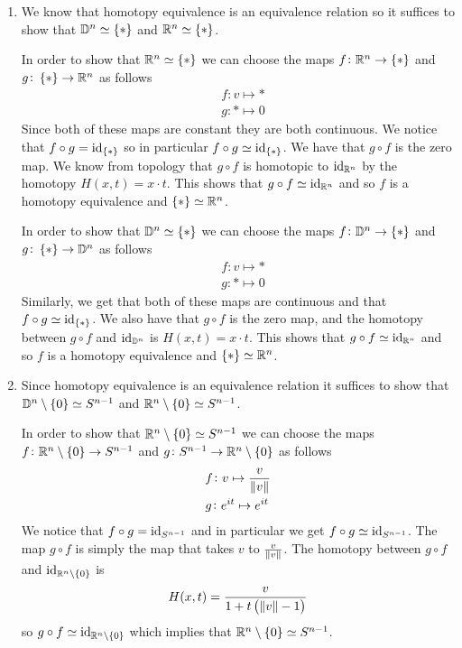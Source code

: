 \documentclass[11pt,a4paper]{article}
\begin{document}
\begin{solution} \phantom{}
  \begin{enumerate}
    \item[(1)] We know that homotopy equivalence is an equivalence relation
      so it suffices to show that $\mathbb{D}^n \simeq \left\{*\right\}$ and
      $\mathbb{R}^n \simeq \left\{*\right\}$.

      In order to show that $\mathbb{R}^n \simeq \left\{*\right\}$ we can choose the maps
      $f \colon \mathbb{R}^n \to \left\{*\right\}$ and $g \colon \left\{*\right\} \to \mathbb{R}^n$
      as follows
      \begin{align*}
        &f \colon v \mapsto * \\ 
        &g \colon * \mapsto 0 
      \end{align*}
      Since both of these maps are constant they are both continuous.
      We notice that $f \circ g = \operatorname{id}_{\left\{*\right\}}$ so in particular
      $f \circ g \simeq \operatorname{id}_{\left\{*\right\}}$.
      We have that $g \circ f$ is the zero map.
      We know from topology that $g \circ f$ is homotopic to $\operatorname{id}_{\mathbb{R}^n}$
      by the homotopy $H(x,t) = x \cdot t$.
      This shows that $g \circ f \simeq \operatorname{id}_{\mathbb{R}^n}$ and so
      $f$ is a homotopy equivalence and $\left\{*\right\} \simeq \mathbb{R}^n$.

      In order to show that $\mathbb{D}^n \simeq \left\{*\right\}$ we can choose the maps
      $f \colon \mathbb{D}^n \to \left\{*\right\}$ and $g \colon \left\{*\right\} \to \mathbb{D}^n$
      as follows
      \begin{align*}
        &f \colon v \mapsto * \\ 
        &g \colon * \mapsto 0 
      \end{align*}
      Similarly, we get that both of these maps are continuous and
      that $f \circ g \simeq \operatorname{id}_{\left\{*\right\}}$.
      We also have that $g \circ f$ is the zero map,
      and the homotopy between $g \circ f$ and $\operatorname{id}_{\mathbb{D}^n}$
      is $H(x,t) = x \cdot t$.
      This shows that $g \circ f \simeq \operatorname{id}_{\mathbb{R}^n}$ and so
      $f$ is a homotopy equivalence and $\left\{*\right\} \simeq \mathbb{R}^n$.
    \item[(2)] Since homotopy equivalence is an equivalence relation
      it suffices to show that $\mathbb{D}^n \setminus \left\{0\right\} \simeq S^{n-1}$
      and $\mathbb{R}^n \setminus \left\{0\right\} \simeq S^{n-1}$.

      In order to show that $\mathbb{R}^n \setminus \left\{0\right\} \simeq S^{n-1}$
      we can choose the maps $f \colon \mathbb{R}^n \setminus \left\{0\right\} \to S^{n-1}$
      and $g \colon S^{n-1} \to \mathbb{R}^n \setminus \left\{0\right\}$ as follows
      \begin{align*}
        &f \colon v \mapsto \frac{v}{\left\lVert v\right\rVert} \\ 
        &g \colon e^{it} \mapsto e^{it} 
      \end{align*}
      We notice that $f \circ g = \operatorname{id}_{S^{n-1}}$ and in particular
      we get $f \circ g \simeq \operatorname{id}_{S^{n-1}}$.
      The map $g \circ f$ is simply the map that takes
      $v$ to $\frac{v}{\left\lVert v\right\rVert}$.
      The homotopy between $g \circ f$ and $\operatorname{id}_{\mathbb{R}^n \setminus \left\{0\right\}}$
      is
      \[
        H(x,t) = \frac{v}{1 + t\del{\norm{v} - 1}}
      \]
      so $g \circ f \simeq \operatorname{id}_{\mathbb{R}^n \setminus \left\{0\right\}}$ which implies
      that $\mathbb{R}^n \setminus \left\{0\right\} \simeq S^{n-1}$.


\end{enumerate}
\end{solution}
\end{document}
